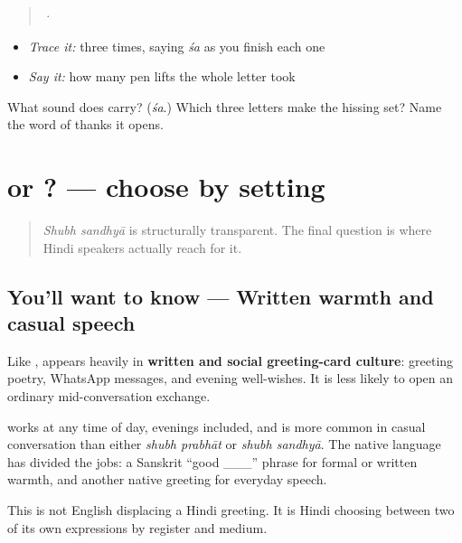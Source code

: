 \begin{quote}
  ·  
\end{quote}

\begin{itemize}
\raggedright
  \item \emph{Trace it:}  three times, saying \emph{śa} as you finish each one
  \item \emph{Say it:} how many pen lifts the whole letter took
\end{itemize}

\begin{tcolorbox}[breakable,colback=teal!4,colframe=teal!35!black,title={Before you move on}]
What sound does \textbf{} carry? (\emph{śa}.) Which three letters make the hissing set? Name the word of thanks it opens.
\end{tcolorbox}
\section[\texorpdfstring{\hi{शुभ} \hi{संध्या} / \hi{नमस्ते} (shubh sandhyā / namaste)}{शुभ संध्या / नमस्ते (shubh sandhyā / namaste)}]{  or ? — choose by setting}

\label{lesson:HI-C32-evening-register}



\begin{quote}
\emph{Shubh sandhyā} is structurally transparent. The final question is where Hindi speakers actually reach for it.
\end{quote}

\subsection*{You'll want to know — Written warmth and casual speech}
Like \textbf{}, \textbf{ } appears heavily in \textbf{written and social greeting-card culture}: greeting poetry, WhatsApp messages, and evening well-wishes. It is less likely to open an ordinary mid-conversation exchange.

\textbf{} works at any time of day, evenings included, and is more common in casual conversation than either \emph{shubh prabhāt} or \emph{shubh sandhyā}. The native language has divided the jobs: a Sanskrit \textquotedblleft{}good \_\_\_\textquotedblright{} phrase for formal or written warmth, and another native greeting for everyday speech.

This is not English displacing a Hindi greeting. It is Hindi choosing between two of its own expressions by register and medium.

